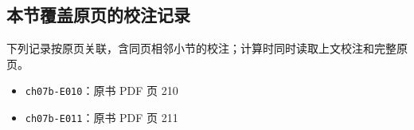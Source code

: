 \documentclass[
  10pt,
  fontset=fandol]{ctexart}
\providecommand{\tightlist}{%
  \setlength{\itemsep}{0pt}\setlength{\parskip}{0pt}}
\begin{document}
\subsection{本节覆盖原页的校注记录}\label{ux672cux8282ux8986ux76d6ux539fux9875ux7684ux6821ux6ce8ux8bb0ux5f55}

下列记录按原页关联，含同页相邻小节的校注；计算时同时读取上文校注和完整原页。

\begin{itemize}
\tightlist
\item
  \texttt{ch07b-E010}：原书 PDF 页 210
\item
  \texttt{ch07b-E011}：原书 PDF 页 211
\end{itemize}
\end{document}
